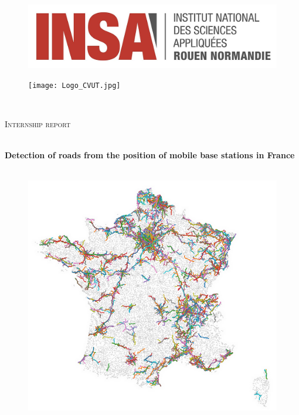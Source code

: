 \documentclass[main.tex]{subfiles}
\begin{document}
\begin{titlepage}
  \begin{sffamily}
  \begin{center}

\begin{minipage}{8cm}
\begin{figure}[H]
    \includegraphics[width=0.9\linewidth]{Logo_INSA.jpg}
\end{figure}
\end{minipage}
\hfill
\begin{minipage}{6cm}
\begin{figure}[H]
    \texttt{[image: Logo\_CVUT.jpg]}
\end{figure}
\end{minipage}\\[1cm]

\begin{Large}
    \textsc{Internship report}\\[1.5cm]
\end{Large}

    \HRule \\[0.4cm]
    { \huge \bfseries Detection of roads from the position of mobile base stations in France \\[0.4cm] } 
    \HRule \\[0.4cm]


    \begin{figure}[H]
           \centering
        \includegraphics[width=0.7\linewidth]{Images/Res_Followline_Dens_Page0.png}
       \label{image}
   \end{figure}
    

\end{center}
\end{sffamily}
\end{titlepage}
\end{document}
